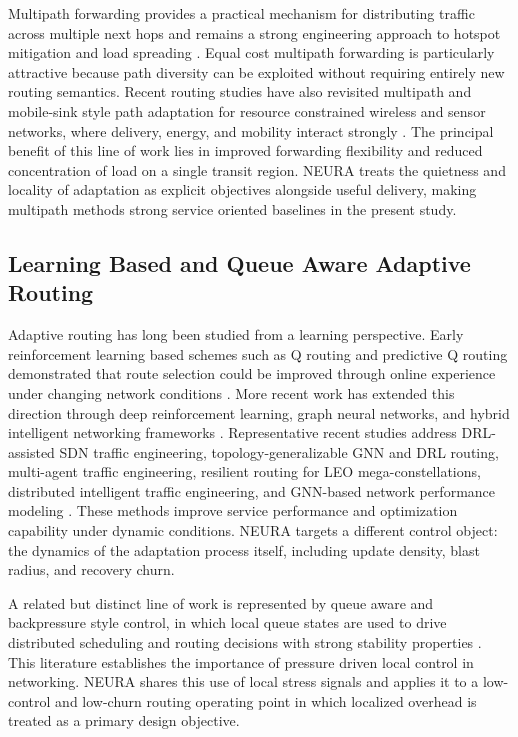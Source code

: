 \documentclass[5p,times]{elsarticle}
\begin{document}
Multipath forwarding provides a practical mechanism for distributing traffic across multiple next hops and remains a strong engineering approach to hotspot mitigation and load spreading \cite{hopps2000ecmp}. Equal cost multipath forwarding is particularly attractive because path diversity can be exploited without requiring entirely new routing semantics. Recent routing studies have also revisited multipath and mobile-sink style path adaptation for resource constrained wireless and sensor networks, where delivery, energy, and mobility interact strongly \cite{singh2025energyaware}. The principal benefit of this line of work lies in improved forwarding flexibility and reduced concentration of load on a single transit region. NEURA treats the quietness and locality of adaptation as explicit objectives alongside useful delivery, making multipath methods strong service oriented baselines in the present study.

\subsection{Learning Based and Queue Aware Adaptive Routing}

Adaptive routing has long been studied from a learning perspective. Early reinforcement learning based schemes such as Q routing and predictive Q routing demonstrated that route selection could be improved through online experience under changing network conditions \cite{boyan1993qrouting,choi1995pqrouting}. More recent work has extended this direction through deep reinforcement learning, graph neural networks, and hybrid intelligent networking frameworks \cite{schulman2017ppo,you2019multiagentdrl,almasan2019drlgnn,jiang2024gnn,tam2024survey}. Representative recent studies address DRL-assisted SDN traffic engineering, topology-generalizable GNN and DRL routing, multi-agent traffic engineering, resilient routing for LEO mega-constellations, distributed intelligent traffic engineering, and GNN-based network performance modeling \cite{pei2024efficientte,ding2024grom,guo2024mate,zhang2025scair,bai2025grlrr,ai2025topog,guo2025dite,ferriol2023routenetfermi,he2024causalgnn,zhang2023tbppo}. These methods improve service performance and optimization capability under dynamic conditions. NEURA targets a different control object: the dynamics of the adaptation process itself, including update density, blast radius, and recovery churn.

A related but distinct line of work is represented by queue aware and backpressure style control, in which local queue states are used to drive distributed scheduling and routing decisions with strong stability properties \cite{tassiulas1992stability,neely2010stochastic}. This literature establishes the importance of pressure driven local control in networking. NEURA shares this use of local stress signals and applies it to a low-control and low-churn routing operating point in which localized overhead is treated as a primary design objective.
\end{document}
